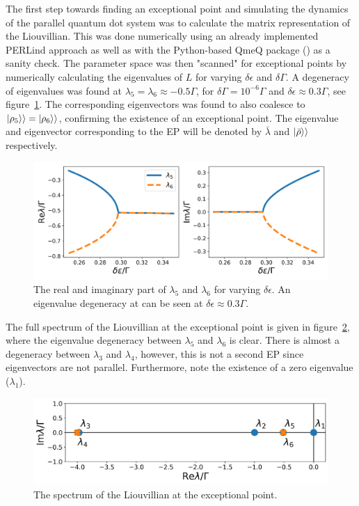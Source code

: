 \documentclass[../main.tex]{subfiles}
\begin{document}
The first step towards finding an exceptional point and simulating the dynamics of the parallel quantum dot system was to calculate the matrix representation of the Liouvillian. This was done numerically using an already implemented PERLind approach as well as with the Python-based QmeQ package (\cite{qmeq}) as a sanity check. The parameter space was then "scanned" for exceptional points by numerically calculating the eigenvalues of $L$ for varying $\delta\epsilon$ and $\delta\Gamma$. A degeneracy of eigenvalues was found at $\lambda_5 = \lambda_6\approx -0.5\Gamma$, for $\delta\Gamma = 10^{-6}\Gamma$ and $\delta\epsilon \approx 0.3\Gamma$, see figure~\ref{fig:tuning}. The corresponding eigenvectors was found to also coalesce to $\ket{\rho_5}\rangle = \ket{\rho_6}\rangle$, confirming the existence of an exceptional point. The eigenvalue and eigenvector corresponding to the EP will be denoted by $\bar \lambda$ and $\ket{\bar\rho}\rangle$ respectively.
\begin{figure}[H]
    \centering
    \includegraphics[width=0.9\linewidth]{figures/tuning.png}
    \caption{The real and imaginary part of $\lambda_5$ and $\lambda_6$ for varying $\delta\epsilon$. An eigenvalue degeneracy at can be seen at $\delta\epsilon\approx0.3\Gamma$.}
    \label{fig:tuning}
\end{figure}

The full spectrum of the Liouvillian at the exceptional point is given in figure~\ref{fig:spec}, where the eigenvalue degeneracy between $\lambda_5$ and $\lambda_6$ is clear. There is almost a degeneracy between $\lambda_3$ and $\lambda_4$, however, this is not a second EP since eigenvectors are not parallel. Furthermore, note the existence of a zero eigenvalue ($\lambda_1$).

\begin{figure}[H]
    \centering
    \includegraphics[width=0.8\linewidth]{figures/spectrum.png}
    \caption{The spectrum of the Liouvillian at the exceptional point.}
    \label{fig:spec}
\end{figure}
\end{document}
